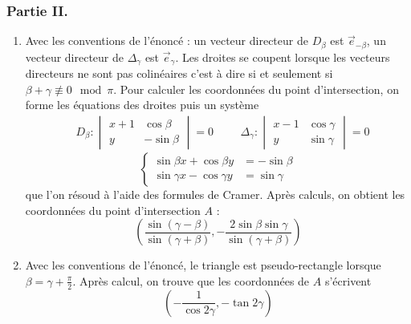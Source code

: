 \subsubsection*{Partie II.}
\begin{enumerate}
\item Avec les conventions de l'énoncé : un vecteur directeur de $D_{\beta}$ est $\overrightarrow{e}_{-\beta}$, un vecteur directeur de $\Delta_{\gamma}$ est $\overrightarrow{e}_{\gamma}$. Les droites se coupent lorsque les vecteurs directeurs ne sont pas colinéaires c'est à dire si et seulement si $\beta +\gamma \not \equiv 0 \mod \pi$.\newline
Pour calculer les coordonnées du point d'intersection, on forme les équations des droites puis un système
\begin{align*}
&D_{\beta} : 
\begin{vmatrix}
x+1 & \cos \beta \\ 
y & -\sin \beta 
\end{vmatrix}
 =0 & &
&\Delta_{\gamma}:
\begin{vmatrix}
x-1 & \cos \gamma \\ 
y & \sin \gamma 
\end{vmatrix}
=0 
\end{align*}
\begin{displaymath}
 \left\lbrace 
\begin{aligned}
\sin \beta x +\cos \beta y & =  -\sin \beta \\ 
\sin \gamma x -\cos \gamma y & =  \sin \gamma 
\end{aligned}
\right. 
\end{displaymath}
que l'on résoud à l'aide des formules de Cramer. Après calculs, on obtient les coordonnées du point d'intersection $A$ :
\[\left( \frac{\sin(\gamma - \beta)}{\sin(\gamma + \beta)},-\frac{2\sin \beta \sin\gamma}{\sin(\gamma + \beta)} \right) \]
\item Avec les conventions de l'énoncé, le triangle est pseudo-rectangle lorsque $\beta=\gamma+\frac{\pi}{2}$. Après calcul, on trouve que les coordonnées de $A$ s'écrivent
\[\left( -\frac{1}{\cos 2\gamma},- \tan 2\gamma\right) \]
\end{enumerate}


